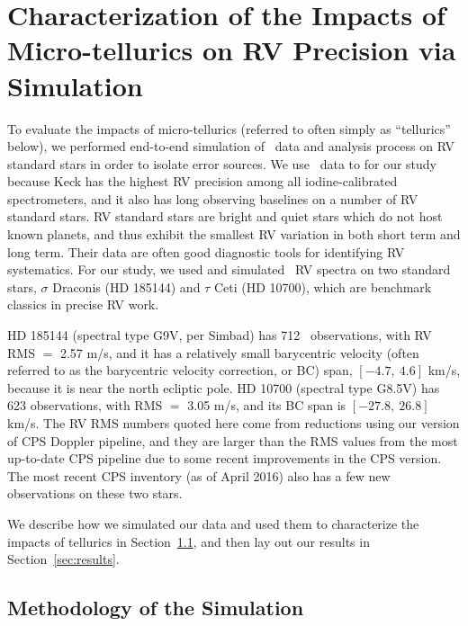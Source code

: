 \section{Characterization of the Impacts of Micro-tellurics on RV
  Precision via Simulation}\label{sec:impact} 

To evaluate the impacts of micro-tellurics (referred to often simply
as ``tellurics'' below), we performed end-to-end simulation of \keck\
data and analysis process on RV standard stars in order to isolate
error sources. We use \keck\ data to for our study because Keck has
the highest RV precision among all iodine-calibrated spectrometers,
and it also has long observing baselines on a number of RV standard
stars. RV standard stars are bright and quiet stars which do not host
known planets, and thus exhibit the smallest RV variation in both
short term and long term. Their data are often good diagnostic tools
for identifying RV systematics. For our study, we used and simulated
\keck\ RV spectra on two standard stars, $\sigma$ Draconis (HD 185144)
and $\tau$ Ceti (HD 10700), which are benchmark classics in precise RV
work.

HD 185144 (spectral type G9V, per Simbad) has 712 \keck\ observations,
with RV RMS $=$ 2.57 m/s, and it has a relatively small barycentric
velocity (often referred to as the barycentric velocity correction, or
BC) span, $[-4.7,\ 4.6]$ km/s, because
it is near the north ecliptic pole. HD 10700 (spectral type G8.5V) has
623 observations, with RMS $=$ 3.05 m/s, and its BC span is $[-27.8,\
26.8]$ km/s. The RV RMS numbers quoted here come from reductions using
our version of CPS Doppler pipeline, and they are larger than the RMS
values from the most up-to-date CPS pipeline due to some recent
improvements in the CPS version. The most recent CPS inventory (as of
April 2016) also has a few new observations on these two stars.

We describe how we simulated our data and used them to characterize
the impacts of tellurics in Section~\ref{sec:method}, and
then lay out our results in Section~\ref{sec:results}.


\subsection{Methodology of the Simulation}\label{sec:method}

